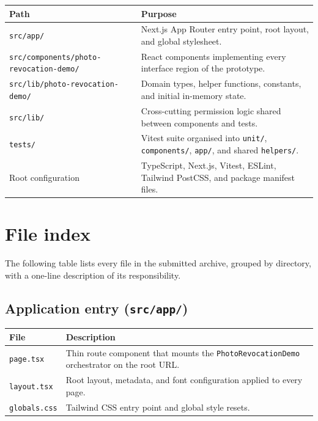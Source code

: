 \begin{center}
\small
\begin{tabular}{@{}P{3.6cm}P{9.8cm}@{}}
\hline
\textbf{Path} & \textbf{Purpose} \\
\hline
\texttt{src/app/} & Next.js App Router entry point, root layout, and global stylesheet. \\
\texttt{src/components/photo-\linebreak[0]revocation-demo/} & React components implementing every interface region of the prototype. \\
\texttt{src/lib/photo-\linebreak[0]revocation-demo/} & Domain types, helper functions, constants, and initial in-memory state. \\
\texttt{src/lib/} & Cross-cutting permission logic shared between components and tests. \\
\texttt{tests/} & Vitest suite organised into \texttt{unit/}, \texttt{components/}, \texttt{app/}, and shared \texttt{helpers/}. \\
Root configuration & TypeScript, Next.js, Vitest, ESLint, Tailwind PostCSS, and package manifest files. \\
\hline
\end{tabular}
\end{center}

\section{File index}
\label{sec:source-index}

\noindent
The following table lists every file in the submitted archive, grouped by directory, with a one-line description of its responsibility.

\subsection*{Application entry (\texttt{src/app/})}

\begin{center}
\small
\begin{tabular}{@{}P{4.6cm}P{9.0cm}@{}}
\hline
\textbf{File} & \textbf{Description} \\
\hline
\texttt{page.tsx} & Thin route component that mounts the \texttt{PhotoRevoca\-tionDemo} orchestrator on the root URL. \\
\texttt{layout.tsx} & Root layout, metadata, and font configuration applied to every page. \\
\texttt{globals.css} & Tailwind CSS entry point and global style resets. \\
\hline
\end{tabular}
\end{center}

